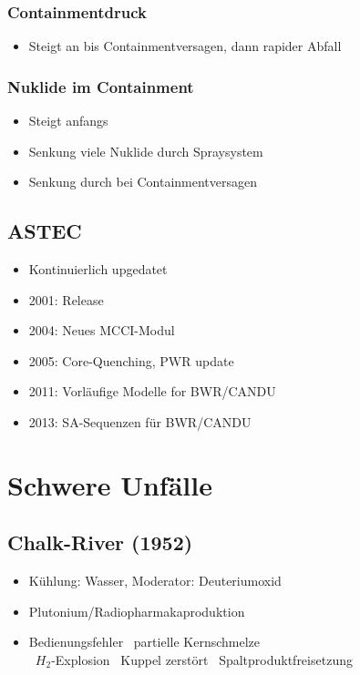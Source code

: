 \documentclass[12pt]{article}
\begin{document}
\subsubsection{Containmentdruck}
\begin{itemize}
  \item Steigt an bis Containmentversagen, dann rapider Abfall
\end{itemize}

\subsubsection{Nuklide im Containment}
\begin{itemize}
  \item Steigt anfangs
  \item Senkung viele Nuklide durch Spraysystem
  \item Senkung durch bei Containmentversagen
\end{itemize}

\subsection{ASTEC}
\begin{itemize}
  \item Kontinuierlich upgedatet
  \item 2001: Release
  \item 2004: Neues MCCI-Modul
  \item 2005: Core-Quenching, PWR update
  \item 2011: Vorläufige Modelle for BWR/CANDU
  \item 2013: SA-Sequenzen für BWR/CANDU
\end{itemize}

\section{Schwere Unfälle}

\subsection{Chalk-River (1952)}
\begin{itemize}
  \item Kühlung: Wasser, Moderator: Deuteriumoxid
  \item Plutonium/Radiopharmakaproduktion
  \item Bedienungsfehler \textrightarrow\ partielle Kernschmelze\\
  \textrightarrow\ \(H_2\)-Explosion \textrightarrow\ Kuppel zerstört \textrightarrow\ Spaltproduktfreisetzung
\end{itemize}
\end{document}

